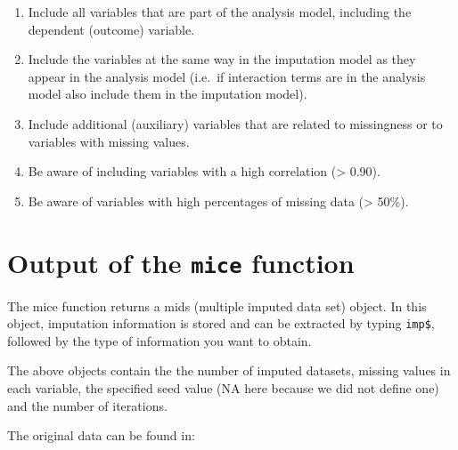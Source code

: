 \documentclass[
]{book}
\newenvironment{Shaded}{\begin{snugshade}}{\end{snugshade}}
\newcommand{\NormalTok}[1]{#1}
\newcommand{\OperatorTok}[1]{\textcolor[rgb]{0.81,0.36,0.00}{\textbf{#1}}}
\providecommand{\tightlist}{%
  \setlength{\itemsep}{0pt}\setlength{\parskip}{0pt}}
\begin{document}
\begin{enumerate}
\def\labelenumi{\arabic{enumi}.}
\tightlist
\item
  Include all variables that are part of the analysis model, including
  the dependent (outcome) variable.
\item
  Include the variables at the same way in the imputation model as they
  appear in the analysis model (i.e.~if interaction terms are in the
  analysis model also include them in the imputation model).
\item
  Include additional (auxiliary) variables that are related to
  missingness or to variables with missing values.
\item
  Be aware of including variables with a high correlation
  (\textgreater{} 0.90).
\item
  Be aware of variables with high percentages of missing data
  (\textgreater{} 50\%).
\end{enumerate}

\hypertarget{output-of-the-mice-function}{%
\section{\texorpdfstring{Output of the \texttt{mice}
function}{Output of the mice function}}\label{output-of-the-mice-function}}

The mice function returns a mids (multiple imputed data set) object. In
this object, imputation information is stored and can be extracted by
typing \texttt{imp\$}, followed by the type of information you want to
obtain.

\begin{Shaded}
\end{Shaded}

The above objects contain the the number of imputed datasets, missing
values in each variable, the specified seed value (NA here because we
did not define one) and the number of iterations.

The original data can be found in:

\begin{Shaded}
\end{Shaded}
\end{document}
